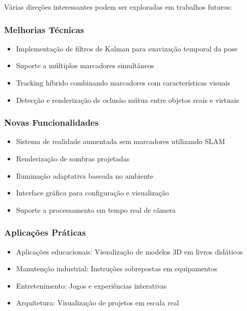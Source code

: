 Várias direções interessantes podem ser exploradas em trabalhos futuros:

\subsubsection{Melhorias Técnicas}

\begin{itemize}
    \item Implementação de filtros de Kalman para suavização temporal da pose
    \item Suporte a múltiplos marcadores simultâneos
    \item Tracking híbrido combinando marcadores com características visuais
    \item Detecção e renderização de oclusão mútua entre objetos reais e virtuais
\end{itemize}

\subsubsection{Novas Funcionalidades}

\begin{itemize}
    \item Sistema de realidade aumentada sem marcadores utilizando SLAM
    \item Renderização de sombras projetadas
    \item Iluminação adaptativa baseada no ambiente
    \item Interface gráfica para configuração e visualização
    \item Suporte a processamento em tempo real de câmera
\end{itemize}

\subsubsection{Aplicações Práticas}

\begin{itemize}
    \item Aplicações educacionais: Visualização de modelos 3D em livros didáticos
    \item Manutenção industrial: Instruções sobrepostas em equipamentos
    \item Entretenimento: Jogos e experiências interativas
    \item Arquitetura: Visualização de projetos em escala real
\end{itemize}

